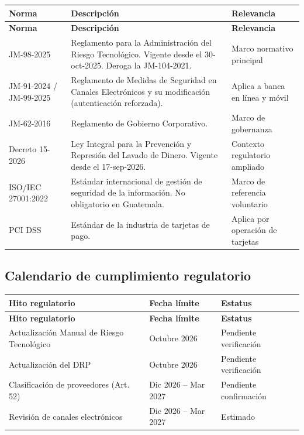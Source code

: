 \documentclass[11pt,a4paper]{article}
\begin{document}
	\begin{longtable}{@{}p{2.5cm}p{8cm}p{4.5cm}@{}}
		\toprule
		\textbf{Norma} & \textbf{Descripción} & \textbf{Relevancia} \\ \midrule
		\endfirsthead
		\toprule
		\textbf{Norma} & \textbf{Descripción} & \textbf{Relevancia} \\ \midrule
		\endhead
		JM-98-2025 & Reglamento para la Administración del Riesgo Tecnológico. Vigente desde el 30-oct-2025. Deroga la JM-104-2021. & Marco normativo principal \\ \midrule
		JM-91-2024 / JM-99-2025 & Reglamento de Medidas de Seguridad en Canales Electrónicos y su modificación (autenticación reforzada). & Aplica a banca en línea y móvil \\ \midrule
		JM-62-2016 & Reglamento de Gobierno Corporativo. & Marco de gobernanza \\ \midrule
		Decreto 15-2026 & Ley Integral para la Prevención y Represión del Lavado de Dinero. Vigente desde el 17-sep-2026. & Contexto regulatorio ampliado \\ \midrule
		ISO/IEC 27001:2022 & Estándar internacional de gestión de seguridad de la información. No obligatorio en Guatemala. & Marco de referencia voluntario \\ \midrule
		PCI DSS & Estándar de la industria de tarjetas de pago. & Aplica por operación de tarjetas \\ \bottomrule
	\end{longtable}
	
	\subsection{Calendario de cumplimiento regulatorio}
	
	\begin{longtable}{@{}p{7.5cm}p{3.5cm}p{4cm}@{}}
		\toprule
		\textbf{Hito regulatorio} & \textbf{Fecha límite} & \textbf{Estatus} \\ \midrule
		\endfirsthead
		\toprule
		\textbf{Hito regulatorio} & \textbf{Fecha límite} & \textbf{Estatus} \\ \midrule
		\endhead
		Actualización Manual de Riesgo Tecnológico & Octubre 2026 & Pendiente verificación \\
		Actualización del DRP & Octubre 2026 & Pendiente verificación \\
		Clasificación de proveedores (Art. 52) & Dic 2026 -- Mar 2027 & Pendiente confirmación \\
		Revisión de canales electrónicos & Dic 2026 -- Mar 2027 & Estimado \\ \bottomrule
	\end{longtable}
	
\end{document}

